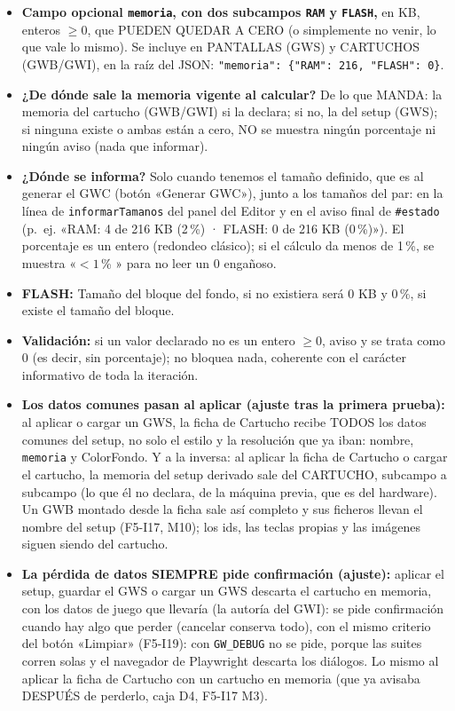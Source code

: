 \begin{itemize}
	\item \textbf{Campo opcional \texttt{memoria}, con dos subcampos
		\texttt{RAM} y \texttt{FLASH},} en KB, enteros $\ge 0$, que PUEDEN QUEDAR
	A CERO (o simplemente no venir, lo que vale lo mismo). Se incluye en
	PANTALLAS (GWS) y CARTUCHOS (GWB/GWI), en la raíz del JSON:
	\texttt{"memoria": \{"RAM": 216, "FLASH": 0\}}.
	\item \textbf{¿De dónde sale la memoria vigente al calcular?} De lo que
	MANDA: la memoria del cartucho (GWB/GWI) si la declara; si no, la del
	setup (GWS); si ninguna existe o ambas están a cero, NO se muestra
	ningún porcentaje ni ningún aviso (nada que informar).
	\item \textbf{¿Dónde se informa?} Solo cuando tenemos el tamaño definido, que es al generar el GWC (botón «Generar GWC»), junto a los
	tamaños del par: en la línea de \texttt{informarTamanos} del panel del
	Editor y en el aviso final de \texttt{\#estado} (p.~ej.
	«RAM: 4 de 216 KB (2\,\%) · FLASH: 0 de 216 KB
	(0\,\%)»). El porcentaje es un entero (redondeo clásico);
	si el cálculo da menos de 1\,\%, se muestra «$< 1$\,\%
	» para no leer un 0 engañoso.
	\item \textbf{FLASH:} Tamaño del bloque del fondo, si no existiera será 0 KB y 0\,\%, si existe el tamaño del bloque. 
	\item \textbf{Validación:} si un valor declarado no
	es un entero $\ge 0$, aviso y se trata como 0 (es decir, sin
	porcentaje); no bloquea nada, coherente con el carácter informativo de
	toda la iteración.
	\item \textbf{Los datos comunes pasan al aplicar (ajuste tras la
	primera prueba):} al aplicar o cargar un GWS, la ficha de Cartucho
	recibe TODOS los datos comunes del setup, no solo el estilo y la
	resolución que ya iban: nombre, \texttt{memoria} y ColorFondo. Y a la
	inversa: al aplicar la ficha de Cartucho o cargar el cartucho, la
	memoria del setup derivado sale del CARTUCHO, subcampo a subcampo (lo
	que él no declara, de la máquina previa, que es del hardware). Un GWB
	montado desde la ficha sale así completo y sus ficheros llevan el
	nombre del setup (F5-I17, M10); los ids, las teclas propias y las
	imágenes siguen siendo del cartucho.
	\item \textbf{La pérdida de datos SIEMPRE pide confirmación (ajuste):}
	aplicar el setup, guardar el GWS o cargar un GWS descarta el cartucho
	en memoria, con los datos de juego que llevaría (la autoría del GWI):
	se pide confirmación cuando hay algo que perder (cancelar conserva
	todo), con el mismo criterio del botón «Limpiar» (F5-I19): con
	\texttt{GW\_DEBUG} no se pide, porque las suites corren solas y el
	navegador de Playwright descarta los diálogos. Lo mismo al aplicar la
	ficha de Cartucho con un cartucho en memoria (que ya avisaba
	DESPUÉS de perderlo, caja D4, F5-I17 M3).
\end{itemize}

